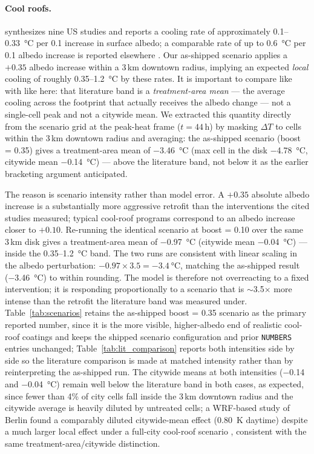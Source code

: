\documentclass[12pt, letterpaper]{article}
\begin{document}
\paragraph{Cool roofs.}
\citet{santamouris2014cool} synthesizes nine US studies and reports a
cooling rate of approximately \SI{0.1}{}--\SI{0.33}{\degreeCelsius} per 0.1
increase in surface albedo; a comparable rate of up to
\SI{0.6}{\degreeCelsius} per 0.1 albedo increase is reported elsewhere
\citep{krayenhoff2021albedo}. Our as-shipped scenario applies a $+0.35$
albedo increase within a 3\,km downtown radius, implying an expected
\emph{local} cooling of roughly \SI{0.35}{}--\SI{1.2}{\degreeCelsius} by
these rates. It is important to compare like with like here: that
literature band is a \emph{treatment-area mean} — the average cooling
across the footprint that actually receives the albedo change — not a
single-cell peak and not a citywide mean. We extracted this quantity
directly from the scenario grid at the peak-heat frame ($t=44$\,h) by
masking $\Delta T$ to cells within the 3\,km downtown radius and
averaging: the as-shipped scenario (boost = 0.35) gives a treatment-area
mean of \SI{-3.46}{\degreeCelsius} (max cell in the disk
\SI{-4.78}{\degreeCelsius}, citywide mean \SI{-0.14}{\degreeCelsius}) —
above the literature band, not below it as the earlier bracketing
argument anticipated.

The reason is scenario intensity rather than model error. A $+0.35$
absolute albedo increase is a substantially more aggressive retrofit
than the interventions the cited studies measured; typical cool-roof
programs correspond to an albedo increase closer to $+0.10$. Re-running
the identical scenario at boost = 0.10 over the same 3\,km disk gives a
treatment-area mean of \SI{-0.97}{\degreeCelsius} (citywide mean
\SI{-0.04}{\degreeCelsius}) — inside the \SI{0.35}{}--\SI{1.2}{\degreeCelsius}
band. The two runs are consistent with linear scaling in the albedo
perturbation: $-0.97 \times 3.5 = \SI{-3.4}{\degreeCelsius}$, matching the
as-shipped result (\SI{-3.46}{\degreeCelsius}) to within rounding. The
model is therefore not overreacting to a fixed intervention; it is
responding proportionally to a scenario that is $\sim$3.5$\times$ more
intense than the retrofit the literature band was measured under.
Table~\ref{tab:scenarios} retains the as-shipped boost = 0.35 scenario as
the primary reported number, since it is the more visible, higher-albedo
end of realistic cool-roof coatings and keeps the shipped scenario
configuration and prior \texttt{NUMBERS} entries unchanged;
Table~\ref{tab:lit_comparison} reports both intensities side by side so
the literature comparison is made at matched intensity rather than by
reinterpreting the as-shipped run. The citywide means at both intensities
(\SI{-0.14}{} and \SI{-0.04}{\degreeCelsius}) remain well below the
literature band in both cases, as expected, since fewer than 4\% of city
cells fall inside the 3\,km downtown radius and the citywide average is
heavily diluted by untreated cells; a WRF-based study of Berlin found a
comparably diluted citywide-mean effect (\SI{0.80}{K} daytime) despite a
much larger local effect under a full-city cool-roof scenario
\citep{wang2022berlin}, consistent with the same
treatment-area/citywide distinction.
\end{document}
